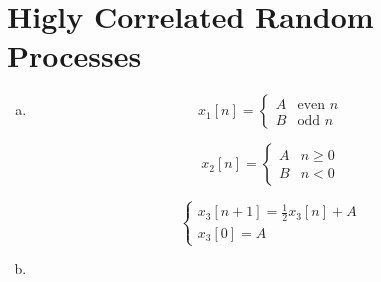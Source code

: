 \section{Higly Correlated Random Processes}\label{sec:p2}

\begin{enumerate}[(a)]
\item
\[x_1[n] = \begin{cases}A & \text{even } n \\ B & \text{odd } n \end{cases}\]


\[x_2[n] = \begin{cases}A & n \geq 0 \\ B & n < 0 \end{cases}\]

\[\begin{cases}x_3[n+1] = \frac{1}{2}x_3[n] + A \\ x_3[0] = A \end{cases}\]
\item
\end{enumerate}